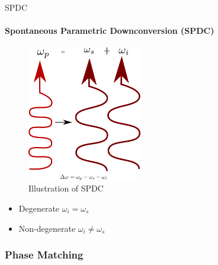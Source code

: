 \documentclass[serif,8pt]{beamer}
\begin{document}
\begin{frame}{SPDC}
	\framesubtitle{Spontaneous Parametric Downconversion (SPDC)}
	\begin{minipage}[l]{0.60\textwidth}
		\begin{figure}
			\begin{center}
				\includegraphics[width=5cm]{SPDC.png}
			\end{center}
			\caption{Illustration of SPDC}
			\label{fig:SPDC}
		\end{figure}
	\end{minipage}
	\begin{minipage}[r]{0.35\textwidth}
		\begin{itemize}
			\item Degenerate $\omega_i = \omega_s$
			\item Non-degenerate $\omega_i \ne \omega_s$
		\end{itemize}
	\end{minipage}
\end{frame}

\subsubsection{Phase Matching}
\end{document}
